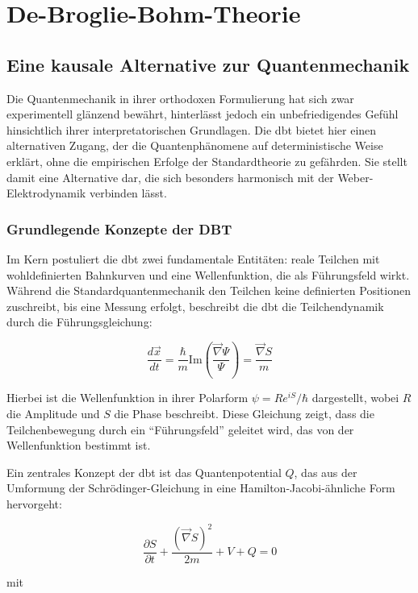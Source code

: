 \chapter{De-Broglie-Bohm-Theorie}
\section{Eine kausale Alternative zur Quantenmechanik}
Die Quantenmechanik in ihrer orthodoxen Formulierung hat sich zwar experimentell glänzend bewährt, hinterlässt jedoch ein unbefriedigendes Gefühl hinsichtlich ihrer
interpretatorischen Grundlagen. Die \gls{dbt} bietet hier einen alternativen Zugang, der die Quantenphänomene auf deterministische Weise erklärt, ohne die empirischen
Erfolge der Standardtheorie zu gefährden. Sie stellt damit eine Alternative dar, die sich besonders harmonisch mit der Weber-Elektrodynamik verbinden lässt.

\subsection{Grundlegende Konzepte der DBT}
Im Kern postuliert die \gls{dbt} zwei fundamentale Entitäten: reale Teilchen mit wohldefinierten Bahnkurven und eine Wellenfunktion, die als Führungsfeld wirkt. Während die
Standardquantenmechanik den Teilchen keine definierten Positionen zuschreibt, bis eine Messung erfolgt, beschreibt die \gls{dbt} die Teilchendynamik durch die Führungsgleichung:

\begin{equation}
    \frac{d\vec{x}}{dt} = \frac{\hbar}{m} \text{Im} \left( \frac{\vec{\nabla} \Psi}{\Psi} \right) = \frac{\vec{\nabla} S}{m}
\end{equation}

Hierbei ist die Wellenfunktion in ihrer Polarform $\psi = R e^{iS}/\hbar$ dargestellt, wobei $R$ die Amplitude und $S$ die Phase beschreibt. Diese Gleichung zeigt, dass die
Teilchenbewegung durch ein \enquote{Führungsfeld} geleitet wird, das von der Wellenfunktion bestimmt ist.

Ein zentrales Konzept der \gls{dbt} ist das Quantenpotential $Q$, das aus der Umformung der Schrödinger-Gleichung in eine Hamilton-Jacobi-ähnliche Form hervorgeht:

\begin{equation}
    \frac{\partial S}{\partial t} + \frac{(\vec{\nabla} S)^2}{2m} + V + Q = 0
\end{equation}

mit

